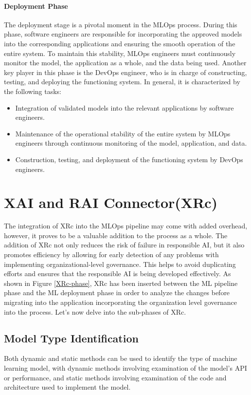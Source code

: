 \documentclass[conference]{IEEEtran}
\begin{document}
\paragraph{Deployment Phase} The deployment stage is a pivotal moment in the MLOps process. During this phase, software engineers are responsible for incorporating the approved models into the corresponding applications and ensuring the smooth operation of the entire system. To maintain this stability, MLOps engineers must continuously monitor the model, the application as a whole, and the data being used. Another key player in this phase is the DevOps engineer, who is in charge of constructing, testing, and deploying the functioning system. In general, it is characterized by the following tasks:
\begin{itemize}
	\item Integration of validated models into the relevant applications by software engineers.
	\item Maintenance of the operational stability of the entire system by MLOps engineers through continuous monitoring of the model, application, and data.
	\item Construction, testing, and deployment of the functioning system by DevOps engineers.
\end{itemize}

\section{XAI and RAI Connector(XRc)}
The integration of XRc into the MLOps pipeline may come with added overhead, however, it proves to be a valuable addition to the process as a whole. The addition of XRc not only reduces the risk of failure in responsible AI, but it also promotes efficiency by allowing for early detection of any problems with implementing organizational-level governance. This helps to avoid duplicating efforts and ensures that the responsible AI is being developed effectively. As shown in Figure \ref{XRc-phase}, XRc has been inserted between the ML pipeline phase and the ML deployment phase in order to analyze the changes before migrating into the application incorporating the organization level governance into the process. Let's now delve into the sub-phases of XRc.

\subsection{Model Type Identification}
Both dynamic and static methods can be used to identify the type of machine learning model, with dynamic methods involving examination of the model's API or performance, and static methods involving examination of the code and architecture used to implement the model.
\end{document}
